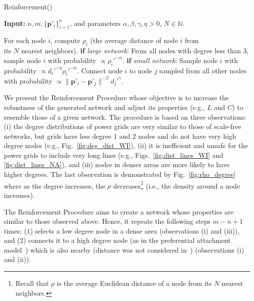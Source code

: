 \documentclass[10pt,journal]{IEEEtran}
\begin{document}
\begin{procedure}[t]
\footnotesize
\caption{Reinforcement()}
\begin{trivlist}
\item\textbf{Input:} $n, m, \{\textbf{p}'_i\}_{i=1}^n$, and parameters $\alpha,\beta,\gamma,\eta>0$, $N\in \mathbb{N}$.
\end{trivlist}
\vspace*{-3mm}
\begin{algorithmic}[1]
\STATE For each node $i$, compute $\rho_i$ (the average distance of node $i$ from \\its $N$ nearest neighbors).
\STATE \textbf{if} \emph{large network}: From all nodes with degree less than 3,\\ sample node $i$  with probability $\propto \rho_i'^{-\alpha}$.
\STATE \textbf{if} \emph{small network}: Sample node $i$  with probability $\propto d_i'^{-\eta}\rho_i'^{-\alpha}$.
\STATE Connect node $i$ to node $j$ sampled from all other nodes with probability $\propto \|\textbf{p}'_i-\textbf{p}'_j\|^{-\beta} d_j'^{\gamma}$.
\ENDFOR
\end{algorithmic}
\label{pro:add_edge}
\end{procedure}
We present the Reinforcement Procedure whose objective is to increase the robustness of the generated network and adjust its properties (e.g., $L$ and $C$) to resemble those of a given network. The procedure is based on three observations: (i) the degree distributions of power grids are very similar to those of scale-free networks, but grids have less degree 1 and 2 nodes and do not have very high degree nodes (e.g., Fig.~\ref{fig:deg_dist_WI}), (ii) it is inefficient and unsafe for the power grids to include very long lines (e.g., Figs.~\ref{fig:dist_lines_WI} and \ref{fig:dist_lines_NA}), and (iii) nodes in denser areas are more likely to have higher degrees. The last observation is demonstrated by Fig.~\ref{fig:rho_degree} where as  the degree increases, the $\rho$ decreases\footnote{Recall that $\rho$ is the average Euclidean distance of a node from its $N$ nearest neighbors.} (i.e., the density around a node increases).

The Reinforcement Procedure aims to create a network whose properties are similar to those observed above. Hence, it repeats the following steps $m-n+1$ times: (1) selects a low degree node in a dense area (observations (i) and (iii)), and (2) connects it to a high degree node (as in the preferential attachment model~\cite{barabasi1999emergence}) which is also nearby (distance was not considered in~\cite{barabasi1999emergence}) (observations (i) and (ii)).
\end{document}

